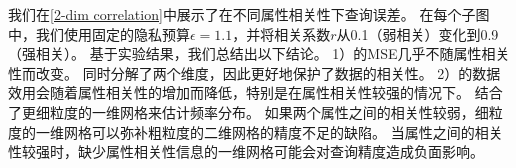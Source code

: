 我们在\autoref{2-dim correlation}中展示了在不同属性相关性下查询误差。
在每个子图中，我们使用固定的隐私预算$\epsilon=1.1$，并将相关系数$r$从0.1（弱相关）变化到0.9（强相关）。
基于实验结果，我们总结出以下结论。
1）\myahead 的MSE几乎不随属性相关性而改变。
\myahead 同时分解了两个维度，因此更好地保护了数据的相关性。
2）\myHDG 的数据效用会随着属性相关性的增加而降低，特别是在属性相关性较强的情况下。
\myHDG 结合了更细粒度的一维网格来估计频率分布。
如果两个属性之间的相关性较弱，细粒度的一维网格可以弥补粗粒度的二维网格的精度不足的缺陷。
当属性之间的相关性较强时，缺少属性相关性信息的一维网格可能会对查询精度造成负面影响。

